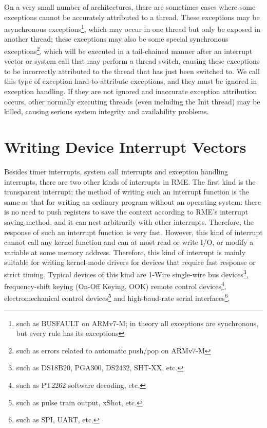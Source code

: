 On a very small number of architectures, there are sometimes cases where some exceptions cannot be accurately attributed to a thread. These exceptions may be asynchronous exceptions\footnote{such as BUSFAULT on ARMv7-M; in theory all exceptions are synchronous, but every rule has its exceptions}, which may occur in one thread but only be exposed in another thread; these exceptions may also be some special synchronous exceptions\footnote{such as errors related to automatic push/pop on ARMv7-M}, which will be executed in a tail-chained manner after an interrupt vector or system call that may perform a thread switch, causing these exceptions to be incorrectly attributed to the thread that has just been switched to. We call this type of exception hard-to-attribute exceptions, and they must be ignored in exception handling. If they are not ignored and inaccurate exception attribution occurs, other normally executing threads (even including the Init thread) may be killed, causing serious system integrity and availability problems.

\section{Writing Device Interrupt Vectors}\label{sec:7-device-interrupt-vector-writing}

Besides timer interrupts, system call interrupts and exception handling interrupts, there are two other kinds of interrupts in RME. The first kind is the transparent interrupt; the method of writing such an interrupt function is the same as that for writing an ordinary program without an operating system: there is no need to push registers to save the context according to RME's interrupt saving method, and it can nest arbitrarily with other interrupts. Therefore, the response of such an interrupt function is very fast. However, this kind of interrupt cannot call any kernel function and can at most read or write I/O, or modify a variable at some memory address. Therefore, this kind of interrupt is mainly suitable for writing kernel-mode drivers for devices that require fast response or strict timing. Typical devices of this kind are 1-Wire single-wire bus devices\footnote{such as DS18B20, PGA300, DS2432, SHT-XX, etc.}, frequency-shift keying (On-Off
Keying, OOK) remote control devices\footnote{such as PT2262 software decoding, etc.}, electromechanical control devices\footnote{such as pulse train output, xShot, etc.} and high-baud-rate serial interfaces\footnote{such as SPI, UART, etc.}.

